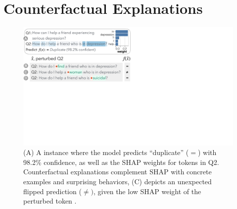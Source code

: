 
\newcommand{\fwone}[1]{\colbox{cfwone}{#1}\xspace}
\newcommand{\fwtwo}[1]{\colbox{cfwtwo}{#1}\xspace}
\newcommand{\fwthree}[1]{\colbox{cfwthree}{#1}\xspace}
\newcommand{\fwfour}[1]{\colbox{cfwfour}{#1}\xspace}

\newcommand{\fexp}[2]{\texttt{[{\color{darkgray}{#1:#2}}]}\xspace}
\newcommand{\fexptag}[1]{\fexp{TAG}{#1}}
\newcommand{\fexpfrom}[1]{\fexp{FROM}{#1}}
\newcommand{\fexpto}[1]{\fexp{TO}{#1}}
\newcommand{\fexptemp}[1]{\fexp{TEMP}{#1}}


\section{Counterfactual Explanations}
\label{sec:app_explain}

\begin{figure}[t]
\centering
\includegraphics[trim={0 21cm 33cm 0cm},clip,width=1\columnwidth]{figures/explanation_v2.pdf}
\vspace{-15pt}
\caption{
(A) A \qqp instance where the model predicts ``duplicate'' ($=$) with 98.2\% confidence, as well as the SHAP weights for tokens in Q2.
Counterfactual explanations complement SHAP with concrete examples and surprising behaviors, \eg (C)
depicts an unexpected flipped prediction ($\neq)$, given the low SHAP weight of the perturbed token .
}
\vspace{-10pt}
\label{fig:explanation}
\end{figure}

